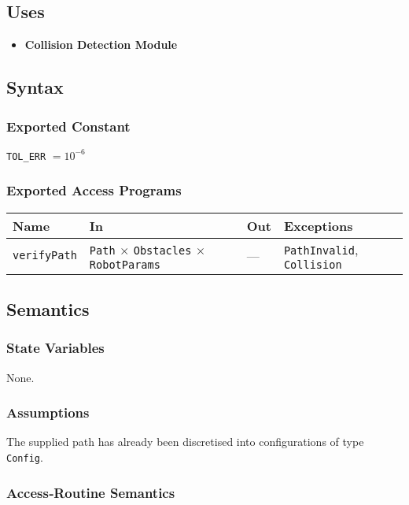 \documentclass[12pt, titlepage]{article}
\begin{document}
\subsection{Uses}
\begin{itemize}
  \item \textbf{Collision Detection Module}
\end{itemize}

\subsection{Syntax}
\subsubsection{Exported Constant}
\texttt{TOL\_ERR} $=10^{-6}$

\subsubsection{Exported Access Programs}
\begin{center}
\renewcommand{\arraystretch}{1.3}
\begin{tabular}{p{3cm} p{6.5cm} p{3cm} p{3cm}}
\toprule
\textbf{Name} & \textbf{In} & \textbf{Out} & \textbf{Exceptions}\\ \midrule
\texttt{verifyPath} & \texttt{Path} $\times$ \texttt{Obstacles} $\times$ \texttt{RobotParams} & --- & \texttt{PathInvalid}, \texttt{Collision}\\
\bottomrule
\end{tabular}
\end{center}

\subsection{Semantics}
\subsubsection{State Variables}
None.

\subsubsection{Assumptions}
The supplied path has already been discretised into configurations of type \texttt{Config}.

\subsubsection{Access‑Routine Semantics}
\end{document}
